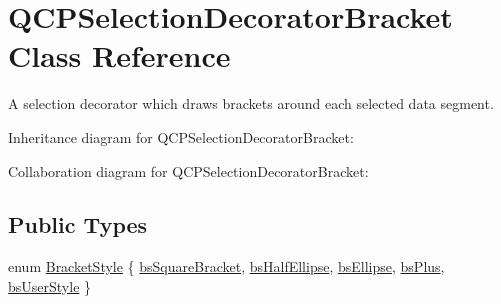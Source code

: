 \hypertarget{classQCPSelectionDecoratorBracket}{}\section{Q\+C\+P\+Selection\+Decorator\+Bracket Class Reference}
\label{classQCPSelectionDecoratorBracket}


A selection decorator which draws brackets around each selected data segment.  




Inheritance diagram for Q\+C\+P\+Selection\+Decorator\+Bracket\+:


Collaboration diagram for Q\+C\+P\+Selection\+Decorator\+Bracket\+:
\subsection*{Public Types}
\begin{DoxyCompactItemize}
\item 
enum \hyperlink{classQCPSelectionDecoratorBracket_aa6d18517ec0553575bbef0de4252336e}{Bracket\+Style} \{ \newline
\hyperlink{classQCPSelectionDecoratorBracket_aa6d18517ec0553575bbef0de4252336eaa10a8d25d409b09256a13220a4d74f81}{bs\+Square\+Bracket}, 
\hyperlink{classQCPSelectionDecoratorBracket_aa6d18517ec0553575bbef0de4252336eafa8ad19b1822c9c03fbe5e9ff8eeeea2}{bs\+Half\+Ellipse}, 
\hyperlink{classQCPSelectionDecoratorBracket_aa6d18517ec0553575bbef0de4252336ea7cab0f2f406e293094a7a1e4903f6e8c}{bs\+Ellipse}, 
\hyperlink{classQCPSelectionDecoratorBracket_aa6d18517ec0553575bbef0de4252336ea86eb6ae27e6296576fdc46d13c840530}{bs\+Plus}, 
\newline
\hyperlink{classQCPSelectionDecoratorBracket_aa6d18517ec0553575bbef0de4252336ea5a627cacdaa30ce434371d6a034b991d}{bs\+User\+Style}
 \}
\end{DoxyCompactItemize}
